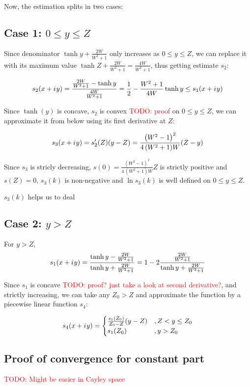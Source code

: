 \documentclass[12pt, a4paper]{article}
\newcommand{\iu}{{i\mkern1mu}}
\newcommand{\todo}[1]{{\large \textcolor{red}{TODO: #1}}}
\begin{document}
Now, the estimation splits in two cases:

\subsection*{Case 1: $0 \le y \le Z$}
Since denominator $\tanh y + \frac{2 W}{W^2 + 1}$ only increases as $0 \le y \le Z$, we can replace it with its maximum value $\tanh Z + \frac{2 W}{W^2 + 1} = \frac{4 W}{W^2 + 1}$, thus getting estimate $s_2$:

\[
s_2(x + \iu y) = \frac{\frac{2 W}{W^2 + 1} - \tanh y}{\frac{4 W}{W^2 + 1}} = \frac{1}{2} - \frac{W^2 + 1}{4 W} \tanh y \le s_1(x + \iu y)
\]

Since $\tanh(y)$ is concave, $s_2$ is convex \todo{proof} on $0 \le y \le Z$, we can approximate it from below using its first derivative at $Z$:

\[
s_3(x + \iu y) = s_2'(Z)(y - Z) = \frac{{\left(W^{2} - 1\right)}^{2}}{4 \, {\left(W^{2} + 1\right)} W} (Z - y)
\]

Since $s_3$ is stricly decreasing, $s(0) = \frac{{\left(W^{2} - 1\right)}^{2}}{4 \, {\left(W^{2} + 1\right)} W} Z$ is strictly positive and $s(Z) = 0$, $s_3(k)$ is non-negative and $\ln s_3(k)$ is well defined on $0 \le y \le Z$.

$s_3(k)$ helps us to deal 


\subsection*{Case 2: $y > Z$}
For $y > Z$, 
\[
s_1(x + \iu y) 
 = \frac{\tanh y - \frac{2 W}{W^2 + 1}}{\tanh y + \frac{2 W}{W^2 + 1}}
 = 1 - 2 \frac{\frac{2 W}{W^2 + 1}}{\tanh y + \frac{2 W}{W^2 + 1}}
\]

Since $s_1$ is concave \todo{proof? just take a look at second derivative?}, and strictly increasing, we can take any $Z_0 > Z$ and approximate the function by a piecewise linear function $s_4$:

\[
s_4(x + \iu y) = 
\begin{cases}
\frac{s_1(Z_0)}{Z_0 - Z} (y - Z) &, Z < y \le Z_0 \\
s_1(Z_0) &, y > Z_0
\end{cases}
\]


\subsection*{Proof of convergence for constant part}
\todo{Might be easier in Cayley space}
\end{document}
